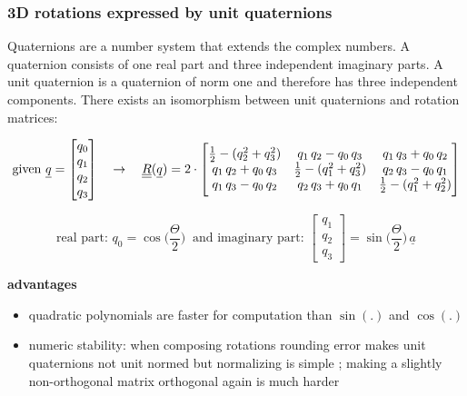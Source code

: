 \begin{frame}
  \frametitle{3D rotations expressed by unit quaternions}
  
  Quaternions are a number system that extends the complex numbers. A quaternion consists of one real part and three independent imaginary parts. A unit quaternion is a quaternion of norm one and therefore has three independent components. \newline
  There exists an isomorphism between unit quaternions and rotation matrices:

  \begin{displaymath}
    \text{given }
    \underline{q} = \begin{bmatrix}
      q_0 \\ q_1 \\ q_2 \\ q_3
    \end{bmatrix} \quad \rightarrow \quad
    \underline{\underline{R}}(\underline{q}) = 2 \cdot \begin{bmatrix}
      \frac{1}{2} - (q_2^2 + q_3^2) & q_1 \, q_2 - q_0 \, q_3 & q_1 \, q_3 + q_0 \, q_2 \\
      q_1 \, q_2 + q_0 \, q_3 & \frac{1}{2} - (q_1^2 + q_3^2) & q_2 \, q_3 - q_0 \, q_1 \\
      q_1 \, q_3 - q_0 \, q_2 & q_2 \, q_3 + q_0 \, q_1 & \frac{1}{2} - (q_1^2 + q_2^2)
    \end{bmatrix}
  \end{displaymath}
  
  \begin{displaymath}
    \text{real part: } q_0 = \cos \biggl( \frac{\Theta}{2} \biggr) \: \text{ and imaginary part: } \begin{bmatrix}
      q_1 \\ q_2 \\ q_3
    \end{bmatrix} = \sin \biggl( \frac{\Theta}{2} \biggr) \, \underline{a}
  \end{displaymath}
  
  \textbf{advantages}
  \begin{itemize}
    \item quadratic polynomials are faster for computation than $\sin(.)$ and $\cos(.)$
    \item numeric stability: when composing rotations rounding error makes unit quaternions not unit normed but normalizing is simple ; making a slightly non-orthogonal matrix orthogonal again is much harder
  \end{itemize}
\end{frame}



